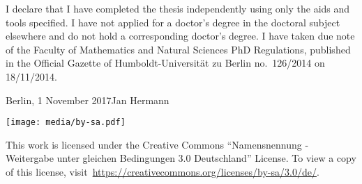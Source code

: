 \noindent I declare that I have completed the thesis independently using only the aids and tools specified.
I have not applied for a doctor's degree in the doctoral subject elsewhere and do not hold a corresponding doctor's degree.
I have taken due note of the Faculty of Mathematics and Natural Sciences PhD Regulations, published in the Official Gazette of Humboldt-Universität zu Berlin no.\ 126/2014 on 18/11/2014.
\vspace{1cm}

\noindent Berlin, 1 November 2017\hfill Jan Hermann
\vspace*{\fill}
\begin{center}
\small
\texttt{[image: media/by-sa.pdf]}
\vspace{.5em}

\noindent This work is licensed under the Creative Commons ``Namensnennung - Weitergabe unter gleichen Bedingungen 3.0 Deutschland'' License. %
To view a copy of this license, visit~\url{https://creativecommons.org/licenses/by-sa/3.0/de/}.
\end{center}




\tableofcontents



\cleardoublepage%










\begingroup
\setlength\bibsep{0pt}
\renewcommand\bibname{References}
\raggedright%
\footnotesize

\endgroup

%
% 


